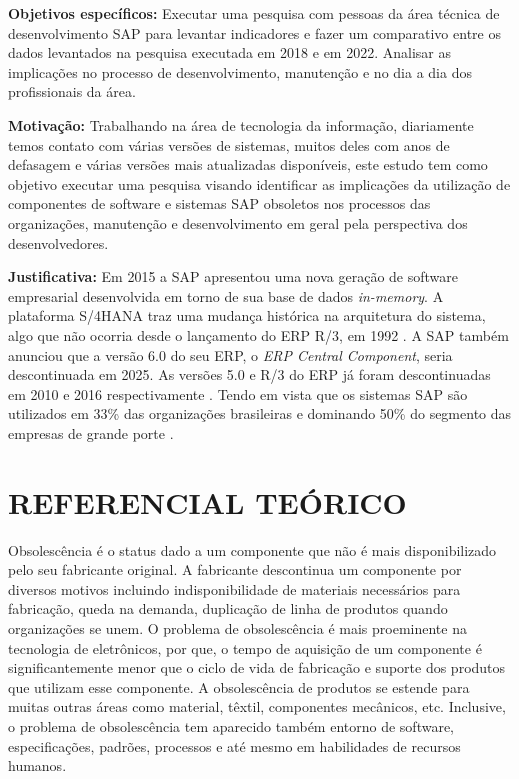 \textbf{Objetivos específicos: } 
Executar uma pesquisa com pessoas da área técnica de desenvolvimento SAP para levantar indicadores e fazer um comparativo entre os dados levantados na pesquisa executada em 2018 e em 2022.
Analisar as implicações no processo de desenvolvimento, manutenção e no dia a dia dos profissionais da área.

\textbf{ Motivação: }
Trabalhando na área de tecnologia da informação, diariamente temos contato com várias versões de sistemas, muitos deles com anos de defasagem e várias versões mais atualizadas disponíveis, este estudo tem como objetivo executar uma pesquisa visando identificar as implicações da utilização de componentes de software e sistemas SAP obsoletos nos processos das organizações, manutenção e desenvolvimento em geral pela perspectiva dos desenvolvedores.

\textbf{Justificativa: }
Em 2015 a SAP apresentou uma nova geração de software empresarial desenvolvida em torno de sua base de dados \textit{in-memory}. A plataforma S/4HANA traz uma mudança histórica na arquitetura do sistema, algo que não ocorria desde o lançamento do ERP R/3, em 1992 \cite{computerworld}. A SAP também anunciou que a versão 6.0 do seu ERP, o \textit{ERP Central Component}, seria descontinuada em 2025. As versões 5.0 e R/3 do ERP já foram descontinuadas em 2010 e 2016 respectivamente \cite{sappam}.
Tendo em vista que os sistemas SAP são utilizados em 33\% das organizações brasileiras e dominando 50\% do segmento das empresas de grande porte \cite{fgv}.

\section{\esp REFERENCIAL TEÓRICO}

Obsolescência é o status dado a um componente que não é mais disponibilizado pelo seu fabricante original. A fabricante descontinua um componente por diversos motivos incluindo indisponibilidade de materiais necessários para fabricação, queda na demanda, duplicação de linha de produtos quando organizações se unem. O problema de obsolescência é mais proeminente na tecnologia de eletrônicos, por que, o tempo de aquisição de um componente é significantemente menor que o ciclo de vida de fabricação e suporte dos produtos que utilizam esse componente. A obsolescência de produtos se estende para muitas outras áreas como material, têxtil, componentes mecânicos, etc. Inclusive, o problema de obsolescência tem aparecido também entorno
de software, especificações, padrões, processos e até mesmo em habilidades de recursos humanos.

